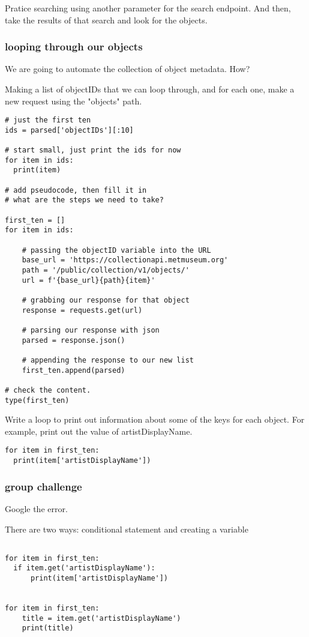\documentclass[11pt]{article}
\begin{document}
Pratice searching using another parameter for the search endpoint. And
then, take the results of that search and look for the objects. 

\subsubsection{looping through our objects}
\label{sec:org5e79620}

We are going to automate the collection of object metadata. How?

Making a list of objectIDs that we can loop through, and for each one,
make a new request using the "objects" path.

\begin{verbatim}
# just the first ten
ids = parsed['objectIDs'][:10]

# start small, just print the ids for now
for item in ids:
  print(item)

# add pseudocode, then fill it in
# what are the steps we need to take?

first_ten = []
for item in ids:

    # passing the objectID variable into the URL
    base_url = 'https://collectionapi.metmuseum.org'
    path = '/public/collection/v1/objects/'
    url = f'{base_url}{path}{item}'

    # grabbing our response for that object
    response = requests.get(url)

    # parsing our response with json
    parsed = response.json()

    # appending the response to our new list
    first_ten.append(parsed)

# check the content.
type(first_ten)

\end{verbatim}

Write a loop to print out information about some of the keys for each
object. For example, print out the value of artistDisplayName.

\begin{verbatim}
for item in first_ten:
  print(item['artistDisplayName'])
\end{verbatim}

\subsubsection{group challenge}
\label{sec:org5cc3eca}
Google the error.

There are two ways: conditional statement and creating a variable
\begin{verbatim}

for item in first_ten:
  if item.get('artistDisplayName'):
      print(item['artistDisplayName'])


for item in first_ten:
    title = item.get('artistDisplayName')
    print(title)
\end{verbatim}
\end{document}
